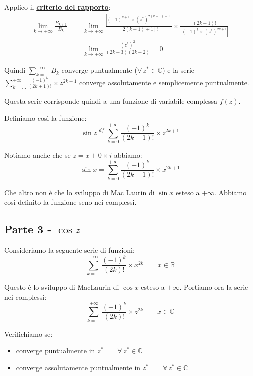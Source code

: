 \documentclass[../../analisi1]{subfiles}
\begin{document}
                Applico il \textbf{\hyperref[criterioRapportoSerie]{criterio del rapporto}}:
                \begin{align*}
                    \lim_{k \to +\infty} \frac{B_{k+1}}{B_k} &= \lim_{k \to +\infty} \frac{\left| (-1)^{k+1} \times (z^*)^{2(k+1)+1}\right|}{\left[2(k+1)+1\right]!} \times \frac{\left(2k+1\right)!}{\left| (-1)^k \times (z^*)^{2k+1}\right|} \\
                    &= \lim_{k \to +\infty} \frac{(z^*)^2}{(2k+3)(2k+2)} = 0
                \end{align*}

                Quindi \(\sum_{k=\dots}^{+\infty} B_k\) converge puntualmente (\(\forall \, z^* \in \mathbb{C}\)) 
                e la serie  \(\sum_{k=\dots}^{+\infty} \frac{(-1)^k}{(2k+1)!} \times z^{2k+1}\) converge assolutamente e semplicemente puntualmente.

                Questa serie corrisponde quindi a una funzione di variabile complessa \(f(z)\).

                Definiamo così la funzione:
                \[  \sin z \stackrel{df}{=} \sum_{k=0}^{+\infty} \frac{(-1)^k}{(2k+1)!} \times z^{2k+1}    \]

                Notiamo anche che se \(z = x + 0 \times i\) abbiamo:
                \[  \sin x = \sum_{k=0}^{+\infty} \frac{(-1)^k}{(2k+1)!} \times x^{2k+1} \]

                Che altro non è che lo sviluppo di Mac Laurin di \(\sin x\) esteso a \(+\infty\). 
                Abbiamo così definito la funzione seno nei complessi.

            \subsection*{Parte 3 - \(\cos z\)}

                Consideriamo la seguente serie di funzioni:
                \[  \sum_{k=\dots}^{+\infty} \frac{(-1)^k}{(2k)!} \times x^{2k} \qquad x \in \mathbb{R}  \]

                Questo è lo sviluppo di MacLaurin di \(\cos x\) esteso a \(+ \infty\). Portiamo ora la serie nei complessi:
                \[  \sum_{k=\dots}^{+\infty} \frac{(-1)^k}{(2k)!} \times z^{2k} \qquad x \in \mathbb{C}  \]

                \newpage

                Verifichiamo se:
                \begin{itemize}
                    \item converge puntualmente in \(z^* \qquad \forall \, z^*  \in \mathbb{C}\)
                    \item converge assolutamente puntualmente in \(z^* \qquad \forall \, z^*  \in \mathbb{C}\)
                \end{itemize}
            
\end{document}
